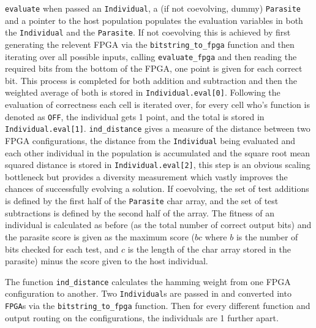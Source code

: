 \texttt{evaluate} when passed an \texttt{Individual}, a (if not coevolving, dummy) \texttt{Parasite}
and a pointer to the host population populates the evaluation variables in both
the \texttt{Individual} and the \texttt{Parasite}. If not coevolving this is achieved
by first generating the relevent FPGA via the \texttt{bitstring\_to\_fpga} function
and then iterating over all possible inputs, calling \texttt{evaluate\_fpga} and
then reading the required bits from the bottom of the FPGA, one point is given
for each correct bit. This process is completed for both addition and subtraction
and then the weighted average of both is stored in \texttt{Individual.eval[0]}.
Following the evaluation of correctness each cell is iterated over, for every
cell who's function is denoted as \texttt{OFF}, the individual gets 1 point,
and the total is stored in \texttt{Individual.eval[1]}. \texttt{ind\_distance}
gives a measure of the distance between two FPGA configurations, the distance
from the \texttt{Individual} being evaluated and each other individual in the
population is accumulated and the square root mean squared distance is stored
in \texttt{Individual.eval[2]}, this step is an obvious scaling bottleneck but
provides a diversity measurement which vastly improves the chances of successfully
evolving a solution. If coevolving, the set of test additions is defined by the
first half of the \texttt{Parasite} char array, and the set of test subtractions
is defined by the second half of the array. The fitness of an individual is calculated
as before (as the total number of correct output bits) and the parasite score is
given as the maximum score ($bc$ where $b$ is the number of bits checked for each
test, and $c$ is the length of the char array stored in the parasite) minus
the score given to the host individual.

The function \texttt{ind\_distance}
calculates the hamming weight from one FPGA configuration to another. Two
\texttt{Individual}s are passed in and converted into \texttt{FPGA}s via the \texttt{bitstring\_to\_fpga}
function. Then for every
different function and output routing on the configurations, the individuals are 1 further apart.

